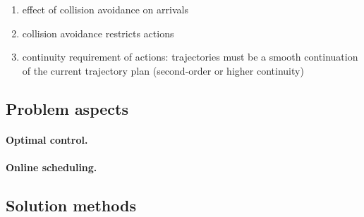 \documentclass{article}
\begin{document}
\begin{enumerate}
  \item effect of collision avoidance on arrivals
  \item collision avoidance restricts actions
  \item continuity requirement of actions: trajectories must be a smooth
        continuation of the current trajectory plan (second-order or higher
        continuity)
\end{enumerate}

\subsection{Problem aspects}

\paragraph{Optimal control.}

\paragraph{Online scheduling.}

\subsection{Solution methods}
\end{document}
